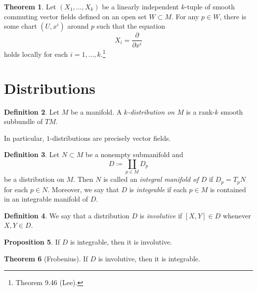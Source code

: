 \documentclass[10pt,letterpaper,cm]{nupset}
\theoremstyle{definition}
\newtheorem{definition}{Definition}[subsection]
\theoremstyle{theorem}
\newtheorem{theorem}[definition]{Theorem}
\newtheorem{prop}[definition]{Proposition}
\theoremstyle{remark}
\newcommand{\1}{\mathbf{1}}
\newcommand{\0}{\vec 0}
\begin{document}
\begin{theorem}
Let $\left(X_1, \ldots, X_k\right)$ be a linearly independent $k$-tuple of smooth commuting vector fields defined on an open set $W\subset M$. For any $p\in W$, there is some chart $(U, x^i)$ around $p$ such that the equation $$X_i = \frac{\partial}{\partial{x^i}}$$ holds locally for each $i=1, \ldots, k$.\footnote{Theorem 9.46 (Lee).}%
\end{theorem}

\section{Distributions}

\begin{definition}
Let $M$ be a manifold. A \textit{$k$-distribution on $M$} is a rank-$k$ smooth subbundle of $TM$.
\end{definition}

In particular, $1$-distributions are precisely vector fields. 

\smallskip

\begin{definition}
Let $N\subset M$ be a nonempty submanifold and $$D \coloneqq \coprod_{p\in M}D_p$$ be a distribution on $M$. Then $N$ is called an \textit{integral manifold of $D$} if $D_p = T_pN$ for each $p\in N$. Moreover, we say that $D$ is \textit{integrable} if each $p\in M$ is contained in an integrable manifold of $D$.  
\end{definition}

\begin{definition}
We say that a distribution $D$ is \textit{involutive} if $[X,Y]\in D$ whenever $X,Y \in D$. 
\end{definition}

\begin{prop}
If $D$ is integrable, then it is involutive.
\end{prop}

\begin{theorem}[Frobenius]
If $D$ is involutive, then it is integrable. 
\end{theorem}
\end{document}
